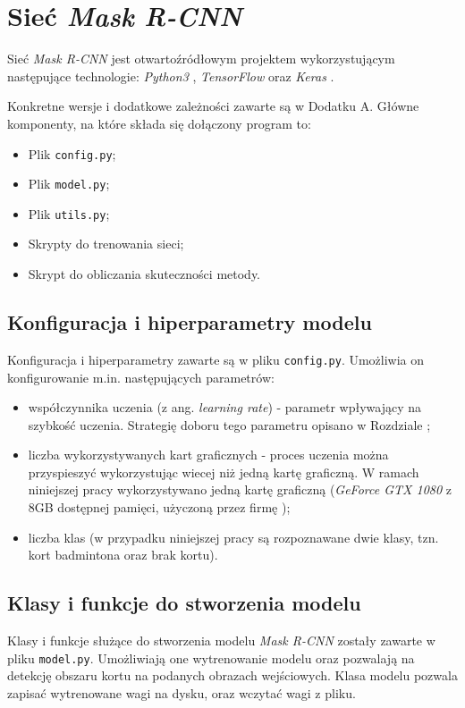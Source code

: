 \newpage
\section{Sieć \textit{Mask R-CNN}}

Sieć \textit{Mask R-CNN} \cite{matterport-mask-rcnn} jest otwartoźródłowym projektem wykorzystującym następujące technologie: \textit{Python3} \cite{python}, \textit{TensorFlow} \cite{tensorflow} oraz \textit{Keras} \cite{keras}.

Konkretne wersje i dodatkowe zależności zawarte są w Dodatku A. Główne komponenty, na które składa się dołączony program to:

\begin{itemize}
  \item Plik \texttt{config.py};
  \item Plik \texttt{model.py};
  \item Plik \texttt{utils.py};
  \item Skrypty do trenowania sieci;
  \item Skrypt do obliczania skuteczności metody.
\end{itemize}

\subsection*{Konfiguracja i hiperparametry modelu}

Konfiguracja i hiperparametry zawarte są w pliku \texttt{config.py}. Umożliwia on konfigurowanie m.in. następujących parametrów:
\begin{itemize}
  \item współczynnika uczenia (z ang. \textit{learning rate}) - parametr wpływający na szybkość uczenia. Strategię doboru tego parametru opisano w Rozdziale ;
  \item liczba wykorzystywanych kart graficznych - proces uczenia można przyspieszyć wykorzystując wiecej niż jedną kartę graficzną. W ramach niniejszej pracy wykorzystywano jedną kartę graficzną (\textit{GeForce GTX 1080} z 8GB dostępnej pamięci, użyczoną przez firmę \blue{});
  \item liczba klas (w przypadku niniejszej pracy są rozpoznawane dwie klasy, tzn. kort badmintona oraz brak kortu).
\end{itemize}

\subsection*{Klasy i funkcje do stworzenia modelu}
Klasy i funkcje służące do stworzenia modelu \textit{Mask R-CNN} zostały zawarte w pliku \texttt{model.py}. Umożliwiają one wytrenowanie modelu oraz pozwalają na detekcję obszaru kortu na podanych obrazach wejściowych. Klasa modelu pozwala zapisać wytrenowane wagi na dysku, oraz wczytać wagi z pliku.

